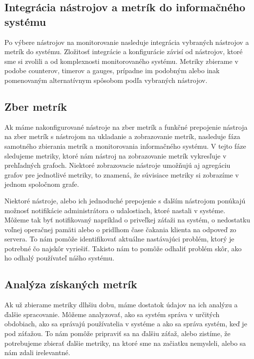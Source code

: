 \documentclass[a4paper, upjsfrontpage, disablespecwarning, thesismargins, thesislinespacing]{rnthesis}
\begin{document}
\subsection*{Integrácia nástrojov a metrík do informačného systému}

Po výbere nástrojov na monitorovanie nasleduje integrácia vybraných nástrojov a metrík do systému.
Zložitosť integrácie a konfigurácie závisí od nástrojov, ktoré sme si zvolili a od komplexnosti monitorovaného systému.
Metriky zbierame v podobe counterov, timerov a gauges, prípadne im podobným alebo inak pomenovaným alternatívnym spôsobom podľa vybraných nástrojov.

\subsection*{Zber metrík}

Ak máme nakonfigurované nástroje na zber metrík a funkčné prepojenie nástroja na zber metrík s nástrojom na ukladanie a zobrazovanie metrík, nasleduje fáza samotného zbierania metrík a monitorovania informačného systému.
V tejto fáze sledujeme metriky, ktoré nám nástroj na zobrazovanie metrík vykresľuje v prehľadných grafoch.
Niektoré zobrazovacie nástroje umožňujú aj agregáciu grafov pre jednotlivé metriky, to znamená, že súvisiace metriky si zobrazíme v jednom spoločnom grafe. 

Niektoré nástroje, alebo ich jednoduché prepojenie s ďalším nástrojom ponúkajú možnosť notifikácie administrátora o udalostiach, ktoré nastali v systéme.
Môžeme tak byť notifikovaný napríklad o priveľkej záťaži na systém, o nedostatku voľnej operačnej pamäti alebo o pridlhom čase čakania klienta na odpoveď zo servera.
To nám pomôže identifikovať aktuálne nastávajúci problém, ktorý je potrebné čo najskôr vyriešiť.
Takisto nám to pomôže odhaliť problém skôr, ako ho odhalý používateľ nášho systému.

\subsection*{Analýza získaných metrík}

Ak už zbierame metriky dlhšiu dobu, máme dostatok údajov na ich analýzu a ďalšie spracovanie.
Môžeme analyzovať, ako sa systém správa v určitých obdobiach, ako sa správajú používatelia v systéme a ako sa správa systém, keď je pod záťažou. To nám pomôže pripraviť sa na ďalšiu záťaž, alebo zistíme, že potrebujeme zbierať ďalšie metriky, na ktoré sme na začiatku nemysleli, alebo sa nám zdali irelevantné.
\end{document}
